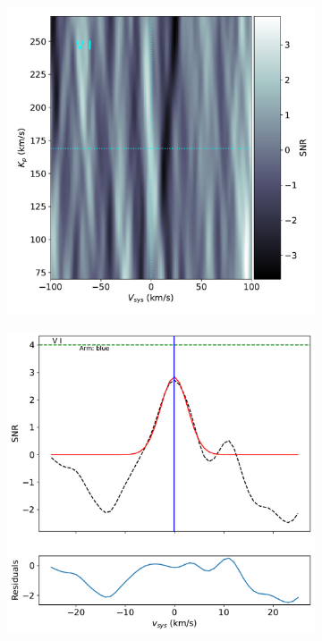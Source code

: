 \documentclass[twocolumn]{aastex631}
\begin{document}
\begin{figure}[ht!]
        \begin{subfigure}[b]{0.333\textwidth}
            \includegraphics[width=\textwidth]{plots-updated/kp-vsys-map/blue/KELT-20b.20190504.blue.V.CCFs-shifted.pdf}
            \label{fig:2d-ccf-V-combined}
        \end{subfigure}
        \begin{subfigure}[b]{0.333\textwidth}
            \includegraphics[width=\textwidth]{plots-updated/line-profile/blue/KELT-20b.20190504.blue.V.SNR-Gaussian.pdf}
            \label{fig:1d-ccf-V-combined}
        \end{subfigure}
   

\end{figure}
\end{document}
